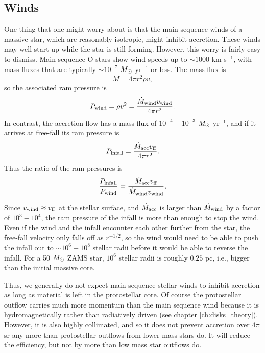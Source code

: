 \subsection{Winds}

One thing that one might worry about is that the main sequence winds of a massive star, which are reasonably isotropic, might inhibit accretion. These winds may well start up while the star is still forming. However, this worry is fairly easy to dismiss. Main sequence O stars show wind speeds up to $\sim 1000$ km s$^{-1}$, with mass fluxes that are typically $\sim 10^{-7}$ $M_{\odot}$ yr$^{-1}$ or less. The mass flux is
\begin{equation}
\dot{M} = 4\pi r^2 \rho v,
\end{equation}
so the associated ram pressure is
\begin{equation}
P_{\rm wind} = \rho v^2 = \frac{\dot{M}_{\rm wind} v_{\rm wind}}{4\pi r^2}.
\end{equation}
In contrast, the accretion flow has a mass flux of $10^{-4}-10^{-3}$ $M_{\odot}$ yr$^{-1}$, and if it arrives at free-fall its ram pressure is
\begin{equation}
P_{\rm infall} = \frac{\dot{M}_{\rm acc} v_{\rm ff}}{4\pi r^2}.
\end{equation}
Thus the ratio of the ram pressures is
\begin{equation}
\frac{P_{\rm infall}}{P_{\rm wind}} = \frac{\dot{M}_{\rm acc} v_{\rm ff}}{\dot{M}_{\rm wind} v_{\rm wind}}.
\end{equation}

Since $v_{\rm wind} \approx v_{\rm ff}$ at the stellar surface, and $\dot{M}_{\rm acc}$ is larger than $\dot{M}_{\rm wind}$ by a factor of $10^3-10^4$, the ram pressure of the infall is more than enough to stop the wind. Even if the wind and the infall encounter each other further from the star, the free-fall velocity only falls off as $r^{-1/2}$, so the wind would need to be able to push the infall out to $\sim 10^6-10^8$ stellar radii before it would be able to reverse the infall. For a 50 $M_{\odot}$ ZAMS star, $10^6$ stellar radii is roughly $0.25$ pc, i.e., bigger than the initial massive core.

Thus, we generally do not expect main sequence stellar winds to inhibit accretion as long as material is left in the protostellar core. Of course the protostellar outflow carries much more momentum than the main sequence wind because it is hydromagnetically rather than radiatively driven (see chapter \ref{ch:disks_theory}). However, it is also highly collimated, and so it does not prevent accretion over $4\pi$ sr any more than protostellar outflows from lower mass stars do. It will reduce the efficiency, but not by more than low mass star outflows do.

